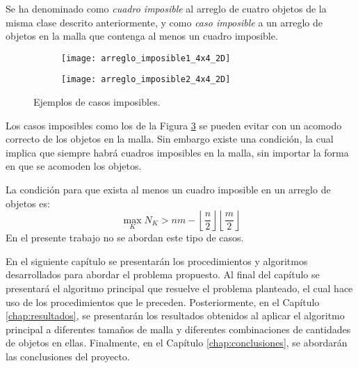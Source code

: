 Se ha denominado como \textsl{cuadro imposible} al arreglo de cuatro objetos de la misma clase descrito anteriormente, y como \textsl{caso imposible} a un arreglo de objetos en la malla que contenga al menos un cuadro imposible.
%
\begin{figure}[H]
	\begin{subfigure}{0.3\textwidth}
		\texttt{[image: arreglo\_imposible1\_4x4\_2D]}%
   		\label{subfig:imposibles_1}%
	\end{subfigure}%
	\hspace{2.2cm}
	\begin{subfigure}{0.3\textwidth}
		\texttt{[image: arreglo\_imposible2\_4x4\_2D]}%
		\label{subfig:imposibles_2}%
	\end{subfigure}%
	\caption{Ejemplos de casos imposibles.}%
	\label{fig:casos_imposibles}%
\end{figure}
%
Los casos imposibles como los de la Figura \ref{fig:casos_imposibles} se pueden evitar con un acomodo correcto de los objetos en la malla.
Sin embargo existe una condición, la cual implica que siempre habrá cuadros imposibles en la malla, sin importar la forma en que se acomoden los objetos.

La condición para que exista al menos un cuadro imposible en un arreglo de objetos es:
%
\begin{equation}
	\label{eq:condicion_imposibles}
	\max_{K} N_K > nm - \left\lfloor \frac{n}{2} \right\rfloor \! \left\lfloor \frac{m}{2} \right\rfloor
\end{equation}
%
En el presente trabajo no se abordan este tipo de casos.

En el siguiente capítulo se presentarán los procedimientos y algoritmos desarrollados para abordar el problema propuesto.
Al final del capítulo se presentará el algoritmo principal que resuelve el problema planteado, el cual hace uso de los procedimientos que le preceden.
Posteriormente, en el Capítulo \ref{chap:resultados}, se presentarán los resultados obtenidos al aplicar el algoritmo principal a diferentes tamaños de malla y diferentes combinaciones de cantidades de objetos en ellas.
Finalmente, en el Capítulo \ref{chap:conclusiones}, se abordarán las conclusiones del proyecto.